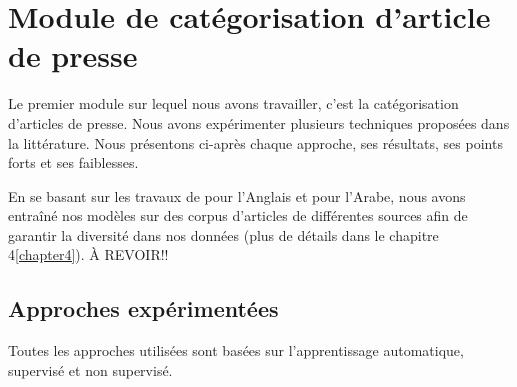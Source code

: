 

\section{Module de catégorisation d'article de presse}
Le premier module sur lequel nous avons travailler, c'est la catégorisation d'articles de presse. Nous avons expérimenter plusieurs techniques proposées dans la littérature. Nous présentons ci-après chaque approche, ses résultats, ses points forts et ses faiblesses.

En se basant sur les travaux de \cite{categorisation} pour l'Anglais et \cite{categorisation} pour l'Arabe, nous avons entraîné nos modèles sur des corpus d'articles de différentes sources afin de garantir la diversité dans nos données (plus de détails dans le chapitre 4\ref{chapter4}).
À REVOIR!!

    \subsection{Approches expérimentées\label{approches}}
    Toutes les approches utilisées sont basées sur l'apprentissage automatique, supervisé et non supervisé. 

